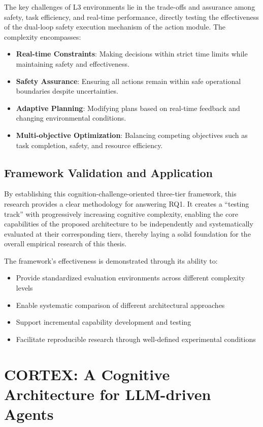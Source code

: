 The key challenges of L3 environments lie in the trade-offs and assurance among safety, task efficiency, and real-time performance, directly testing the effectiveness of the dual-loop safety execution mechanism of the action module. The complexity encompasses:
\begin{itemize}
\item \textbf{Real-time Constraints}: Making decisions within strict time limits while maintaining safety and effectiveness.
\item \textbf{Safety Assurance}: Ensuring all actions remain within safe operational boundaries despite uncertainties.
\item \textbf{Adaptive Planning}: Modifying plans based on real-time feedback and changing environmental conditions.
\item \textbf{Multi-objective Optimization}: Balancing competing objectives such as task completion, safety, and resource efficiency.
\end{itemize}

\subsection{Framework Validation and Application}

By establishing this cognition-challenge-oriented three-tier framework, this research provides a clear methodology for answering RQ1. It creates a ``testing track'' with progressively increasing cognitive complexity, enabling the core capabilities of the proposed architecture to be independently and systematically evaluated at their corresponding tiers, thereby laying a solid foundation for the overall empirical research of this thesis.

The framework's effectiveness is demonstrated through its ability to:
\begin{itemize}
\item Provide standardized evaluation environments across different complexity levels
\item Enable systematic comparison of different architectural approaches
\item Support incremental capability development and testing
\item Facilitate reproducible research through well-defined experimental conditions
\end{itemize}

\section{CORTEX: A Cognitive Architecture for LLM-driven Agents}

